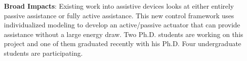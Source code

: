 \textbf{Broad Impacts}: Existing work into assistive devices looks at either entirely passive assistance or fully active assistance. This new control framework uses individualized modeling to develop an active/passive actuator that can provide assistance without a large energy draw. Two Ph.D. students are working on this project and one of them graduated recently with his Ph.D. Four undergraduate students are participating.  